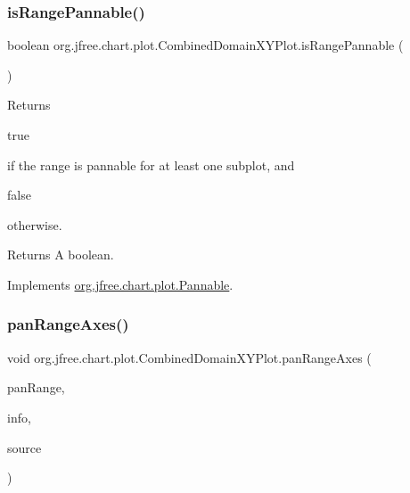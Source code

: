 \subsubsection{\texorpdfstring{is\+Range\+Pannable()}{isRangePannable()}}
{\footnotesize\ttfamily boolean org.\+jfree.\+chart.\+plot.\+Combined\+Domain\+X\+Y\+Plot.\+is\+Range\+Pannable (\begin{DoxyParamCaption}{ }\end{DoxyParamCaption})}

Returns
\begin{DoxyCode}
\textcolor{keyword}{true} 
\end{DoxyCode}
 if the range is pannable for at least one subplot, and
\begin{DoxyCode}
\textcolor{keyword}{false} 
\end{DoxyCode}
 otherwise.

\begin{DoxyReturn}{Returns}
A boolean. 
\end{DoxyReturn}


Implements \mbox{\hyperlink{interfaceorg_1_1jfree_1_1chart_1_1plot_1_1_pannable_ad1e4f1dde36baf9964ac14654aab4f8e}{org.\+jfree.\+chart.\+plot.\+Pannable}}.

\mbox{\label{classorg_1_1jfree_1_1chart_1_1plot_1_1_combined_domain_x_y_plot_aa2f62463d5afbab1a8de6cc6e832b2b0}} 
\subsubsection{\texorpdfstring{pan\+Range\+Axes()}{panRangeAxes()}}
{\footnotesize\ttfamily void org.\+jfree.\+chart.\+plot.\+Combined\+Domain\+X\+Y\+Plot.\+pan\+Range\+Axes (\begin{DoxyParamCaption}\item[{double}]{pan\+Range,  }\item[{\mbox{\hyperlink{classorg_1_1jfree_1_1chart_1_1plot_1_1_plot_rendering_info}{Plot\+Rendering\+Info}}}]{info,  }\item[{Point2D}]{source }\end{DoxyParamCaption})}

